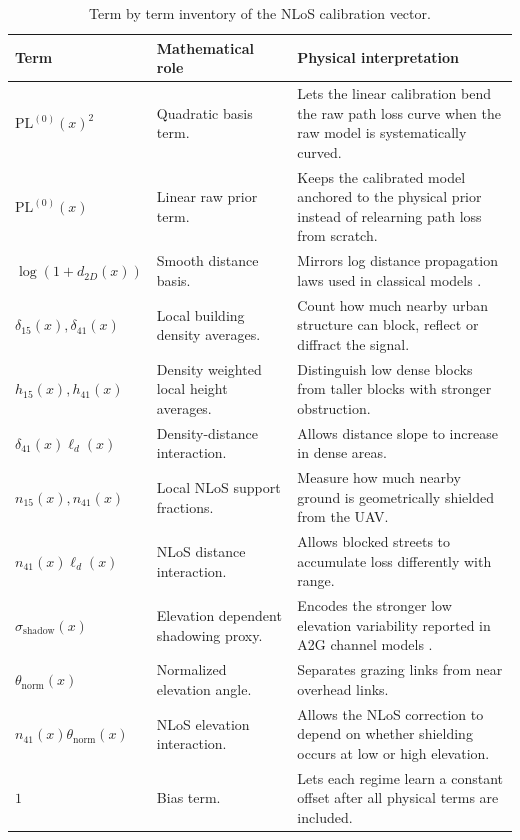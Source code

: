 \begin{table}[H]
\centering
\caption{Term by term inventory of the NLoS calibration
vector.}
\label{tab:pl_nlos_term_inventory}
\small
\begin{tabularx}{\textwidth}{p{3.1cm} X X}
\toprule
\textbf{Term} & \textbf{Mathematical role} & \textbf{Physical interpretation} \\
\midrule
\(\mathrm{PL}^{(0)}(x)^2\) & Quadratic basis term. & Lets the linear calibration bend the raw path loss curve when the raw model is systematically curved. \\
\(\mathrm{PL}^{(0)}(x)\) & Linear raw prior term. & Keeps the calibrated model anchored to the physical prior instead of relearning path loss from scratch. \\
\(\log(1+d_{2D}(x))\) & Smooth distance basis. & Mirrors log distance propagation laws used in classical models \cite{rappaport,cost231}. \\
\(\delta_{15}(x),\delta_{41}(x)\) & Local building density averages. & Count how much nearby urban structure can block, reflect or diffract the signal. \\
\(h_{15}(x),h_{41}(x)\) & Density weighted local height averages. & Distinguish low dense blocks from taller blocks with stronger obstruction. \\
\(\delta_{41}(x)\ell_d(x)\) & Density-distance interaction. & Allows distance slope to increase in dense areas. \\
\(n_{15}(x),n_{41}(x)\) & Local NLoS support fractions. & Measure how much nearby ground is geometrically shielded from the UAV. \\
\(n_{41}(x)\ell_d(x)\) & NLoS distance interaction. & Allows blocked streets to accumulate loss differently with range. \\
\(\sigma_{\mathrm{shadow}}(x)\) & Elevation dependent shadowing proxy. & Encodes the stronger low elevation variability reported in A2G channel models \cite{khawaja_survey,tr38901}. \\
\(\theta_{\mathrm{norm}}(x)\) & Normalized elevation angle. & Separates grazing links from near overhead links. \\
\(n_{41}(x)\theta_{\mathrm{norm}}(x)\) & NLoS elevation interaction. & Allows the NLoS correction to depend on whether shielding occurs at low or high elevation. \\
\(1\) & Bias term. & Lets each regime learn a constant offset after all physical terms are included. \\
\bottomrule
\end{tabularx}
\end{table}

